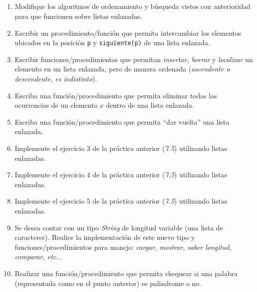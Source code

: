 \documentclass[a4paper,10pt]{article}
\begin{document}
~\\ \\ \\ \\

\begin{enumerate}

\item Modifique los algoritmos de ordenamiento y b\'usqueda vistos con anterioridad para que funcionen sobre listas enlazadas.

\item Escribir un procedimiento/funci\'on que permita intercambiar los elementos ubicados en la posici\'on \verb-p- y \verb-siguiente(p)- de una lista enlazada.
     
\item Escribir funciones/procedimientos que permitan \emph{insertar, borrar} y \emph{localizar} un elemento en un lista enlazada, pero de manera ordenada (\emph{ascendente o descendente, es indistinto}).
    
\item Escriba una funci\'on/procedimiento que permita eliminar todas las ocurrencias de un elemento $x$ dentro de una lista enlazada.

\item Escriba una funci\'on/procedimiento que permita ``dar vuelta'' una lista enlazada.

\item Implemente el ejercicio 3 de la pr\'actica anterior (\emph{7.5}) utilizando listas enlazadas.   

\item Implemente el ejercicio 4 de la pr\'actica anterior (\emph{7.5}) utilizando listas enlazadas.

\item Implemente el ejercicio 5 de la pr\'actica anterior (\emph{7.5}) utilizando listas enlazadas.

\item Se desea contar con un tipo \emph{String} de longitud variable (una lista de caracteres). Realice la implementaci\'on de este nuevo tipo y funciones/procedimientos para manejo: \emph{cargar, mostrar, saber longitud, comparar, etc...}

\item Realizar una funci\'on/procedimiento que permita chequear si una palabra (representada como en el punto anterior) es palindrome o no. 
     
\end{enumerate}
\end{document}

